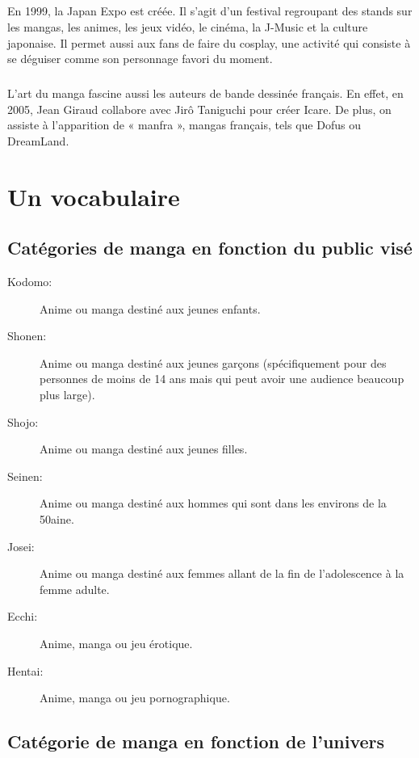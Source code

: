 \paragraph{}
En 1999, la Japan Expo est créée. Il s’agit d’un festival regroupant des stands sur les mangas, les animes, les jeux vidéo, le cinéma, la J-Music et la culture japonaise. Il permet aussi aux fans de faire du cosplay, une activité qui consiste à se déguiser comme son personnage favori du moment. 
\paragraph{}
L’art du manga fascine aussi les auteurs de bande dessinée français. En effet, en 2005, Jean Giraud collabore avec Jirô Taniguchi pour créer Icare. De plus, on assiste à l’apparition de « manfra », mangas français, tels que Dofus ou DreamLand.

\chapter{Un vocabulaire}

\section{Catégories de manga en fonction du public visé}

\begin{description}
	\item[Kodomo:] Anime ou manga destiné aux jeunes enfants.
	\item[Shonen:] Anime ou manga destiné aux jeunes garçons (spécifiquement
		pour des personnes de moins de 14 ans mais qui peut avoir une audience
		beaucoup plus large).
	\item[Shojo:] Anime ou manga destiné aux jeunes filles.
	\item[Seinen:] Anime ou manga destiné aux hommes qui sont dans les environs
		de la 50aine.
	\item[Josei:] Anime ou manga destiné aux femmes allant de la fin de
		l'adolescence à la femme adulte.
	\item[Ecchi:] Anime, manga ou jeu érotique.
	\item[Hentai:] Anime, manga ou jeu pornographique.
\end{description}

\section{Catégorie de manga en fonction de l'univers}

